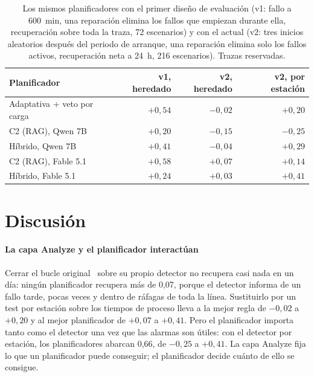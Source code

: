 \documentclass[preprint,11pt]{elsarticle}
\begin{document}
\begin{table}[t]
\centering
\caption{Los mismos planificadores con el primer diseño de evaluación (v1: fallo a 600~min, una reparación elimina los fallos que empiezan durante ella, recuperación sobre toda la traza, 72 escenarios) y con el actual (v2: tres inicios aleatorios después del periodo de arranque, una reparación elimina solo los fallos activos, recuperación neta a 24~h, 216 escenarios). Trazas reservadas.}
\label{tab:designs}
\small
\begin{tabular}{lrrr}
\toprule
Planificador & v1, heredado & v2, heredado & v2, por estación \\
\midrule
Adaptativa + veto por carga & $+0{,}54$ & $-0{,}02$ & $+0{,}20$ \\
C2 (RAG), Qwen 7B & $+0{,}20$ & $-0{,}15$ & $-0{,}25$ \\
Híbrido, Qwen 7B & $+0{,}41$ & $-0{,}04$ & $+0{,}29$ \\
C2 (RAG), Fable 5.1 & $+0{,}58$ & $+0{,}07$ & $+0{,}14$ \\
Híbrido, Fable 5.1 & $+0{,}24$ & $+0{,}03$ & $+0{,}41$ \\
\bottomrule
\end{tabular}
\end{table}

\section{Discusión}
\label{sec:discussion}

\paragraph{La capa Analyze y el planificador interactúan}
Cerrar el bucle original~\cite{sanchez2020selfstar} sobre su propio detector no recupera casi nada en un día: ningún planificador recupera más de 0{,}07, porque el detector informa de un fallo tarde, pocas veces y dentro de ráfagas de toda la línea. Sustituirlo por un test por estación sobre los tiempos de proceso lleva a la mejor regla de $-0{,}02$ a $+0{,}20$ y al mejor planificador de $+0{,}07$ a $+0{,}41$. Pero el planificador importa tanto como el detector una vez que las alarmas son útiles: con el detector por estación, los planificadores abarcan 0{,}66, de $-0{,}25$ a $+0{,}41$. La capa Analyze fija lo que un planificador puede conseguir; el planificador decide cuánto de ello se consigue.
\end{document}
